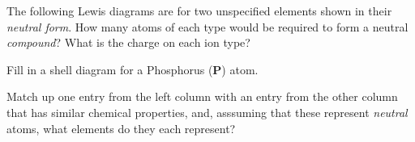 \documentclass[addpoints, 12pt]{exam}
\begin{document}
\begin{questions}
\question[10]
The following Lewis diagrams are for two unspecified elements shown in
their \emph{neutral form}.  How many atoms of each type would be
required to form a neutral \emph{compound}?  What is the charge on
each ion type? 

\vspace{1cm}

\question[10]  Fill in a shell diagram for a Phosphorus (\textbf{P}) atom.
\vspace{1cm}

\question[5]\label{orbitals} Match up one entry from the left column with an entry from the other
  column that has similar chemical properties, and, asssuming that
  these represent \emph{neutral} atoms, what elements do they each represent?


\end{questions}
\end{document}
